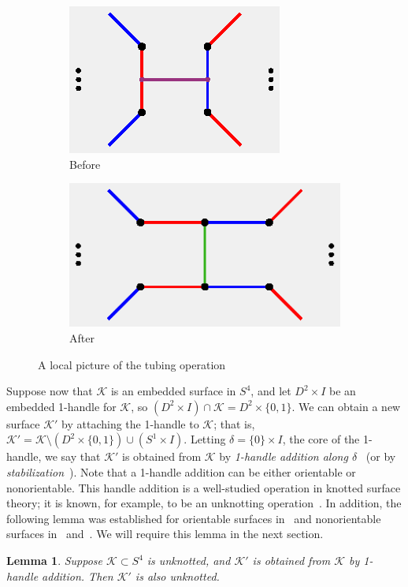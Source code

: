 \documentclass[11pt, oneside]{amsart}
\theoremstyle{theorem}
\newtheorem{lemma}[theorem]{Lemma}
\theoremstyle{definition}
\newcommand{\X}{\times}
\newcommand{\K}{\mathcal{K}}
\theoremstyle{theorem}
\begin{document}
\begin{figure}[h!]
\begin{subfigure}{.5\textwidth}
  \centering
  \includegraphics[width=.5\linewidth]{tube1.eps}
  \caption{Before}
  \label{tub1}
\end{subfigure}%
\begin{subfigure}{.5\textwidth}
  \centering
  \includegraphics[width=.65\linewidth]{tube2.eps}
  \caption{After}
  \label{tub2}
\end{subfigure}
\caption{A local picture of the tubing operation}
\label{tub}
\end{figure}

Suppose now that $\K$ is an embedded surface in $S^4$, and let $D^2 \X I$ be an embedded 1-handle for $\K$, so $(D^2 \X I) \cap \K = D^2 \X \{0,1\}$.  We can obtain a new surface $\K'$ by attaching the 1-handle to $\K$; that is, $\K' = \K \setminus (D^2 \X \{0,1\}) \cup (S^1 \X I)$.  Letting $\delta = \{0\} \X I$, the core of the 1-handle, we say that $\K'$ is obtained from $\K$ by \emph{1-handle addition along $\delta$}~\cite{CKS} (or by \emph{stabilization}~\cite{BS}).  Note that a 1-handle addition can be either orientable or nonorientable.  This handle addition is a well-studied operation in knotted surface theory; it is known, for example, to be an unknotting operation~\cite{HoKa}.  In addition, the following lemma was established for orientable surfaces in~\cite{HoKa} and nonorientable surfaces in~\cite{Kamada} and~\cite{BS}.  We will require this lemma in the next section.

\begin{lemma}\label{unknot}
Suppose $\K \subset S^4$ is unknotted, and $\K'$ is obtained from $\K$ by 1-handle addition.  Then $\K'$ is also unknotted.
\end{lemma}
\end{document}
